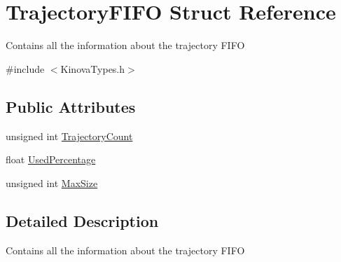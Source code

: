 \hypertarget{struct_trajectory_f_i_f_o}{\section{Trajectory\-F\-I\-F\-O Struct Reference}
\label{struct_trajectory_f_i_f_o}
}


\par
Contains all the information about the trajectory F\-I\-F\-O  




{\ttfamily \#include $<$Kinova\-Types.\-h$>$}

\subsection*{Public Attributes}
\begin{DoxyCompactItemize}
\item 
unsigned int \hyperlink{struct_trajectory_f_i_f_o_a8d2d82f71459128dd803eb7c9e09c2c6}{Trajectory\-Count}
\item 
float \hyperlink{struct_trajectory_f_i_f_o_aa522f62f9f815f31be1d03c0b89653f5}{Used\-Percentage}
\item 
unsigned int \hyperlink{struct_trajectory_f_i_f_o_ab57ade5bd66a71bfede38fb4d300d1d7}{Max\-Size}
\end{DoxyCompactItemize}


\subsection{Detailed Description}
\par
Contains all the information about the trajectory F\-I\-F\-O 



